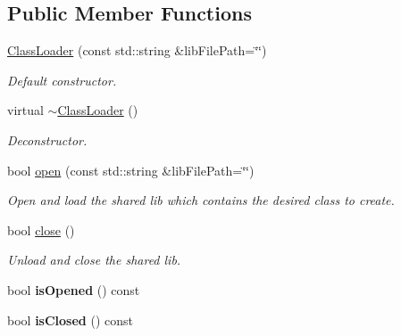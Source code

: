 \subsection*{Public Member Functions}
\begin{DoxyCompactItemize}
\item 
\hyperlink{classow__plugin__loader_1_1ClassLoader_a6578b700790fbf7659e81aceabee7630}{Class\+Loader} (const std\+::string \&lib\+File\+Path=\char`\"{}\char`\"{})\hypertarget{classow__plugin__loader_1_1ClassLoader_a6578b700790fbf7659e81aceabee7630}{}\label{classow__plugin__loader_1_1ClassLoader_a6578b700790fbf7659e81aceabee7630}

\begin{DoxyCompactList}\small\item\em Default constructor. \end{DoxyCompactList}\item 
virtual \hyperlink{classow__plugin__loader_1_1ClassLoader_a8c85ba871c8a9caf9734eaf5111bee63}{$\sim$\+Class\+Loader} ()\hypertarget{classow__plugin__loader_1_1ClassLoader_a8c85ba871c8a9caf9734eaf5111bee63}{}\label{classow__plugin__loader_1_1ClassLoader_a8c85ba871c8a9caf9734eaf5111bee63}

\begin{DoxyCompactList}\small\item\em Deconstructor. \end{DoxyCompactList}\item 
bool \hyperlink{classow__plugin__loader_1_1ClassLoader_aa748690ab43967584daff8db4269fa49}{open} (const std\+::string \&lib\+File\+Path=\char`\"{}\char`\"{})
\begin{DoxyCompactList}\small\item\em Open and load the shared lib which contains the desired class to create. \end{DoxyCompactList}\item 
bool \hyperlink{classow__plugin__loader_1_1ClassLoader_ae1b7d5da12b27e6ffbf34b9b8242e4f1}{close} ()
\begin{DoxyCompactList}\small\item\em Unload and close the shared lib. \end{DoxyCompactList}\item 
bool {\bfseries is\+Opened} () const \hypertarget{classow__plugin__loader_1_1ClassLoader_a6fc48740bceb814da7af5ccdfe5ec6bb}{}\label{classow__plugin__loader_1_1ClassLoader_a6fc48740bceb814da7af5ccdfe5ec6bb}

\item 
bool {\bfseries is\+Closed} () const \hypertarget{classow__plugin__loader_1_1ClassLoader_a32af91737fb08d8d40007ed9e8ad7acb}{}\label{classow__plugin__loader_1_1ClassLoader_a32af91737fb08d8d40007ed9e8ad7acb}


\end{DoxyCompactItemize}
